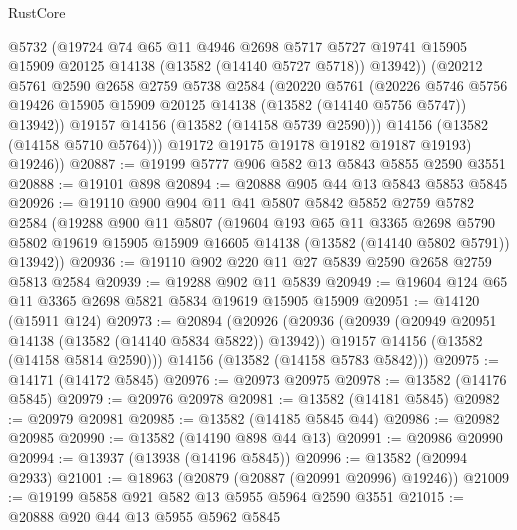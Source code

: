 \begin{lexlean}{RustCore}
\begin{coremodule}
              @5732
              (@19724
                @74
                @65
                @11
                @4946
                @2698
                @5717
                @5727
                @19741
                @15905
                @15909
                @20125
                @14138
                (@13582 (@14140 @5727 @5718))
                @13942))
            (@20212
              @5761
              @2590
              @2658
              @2759
              @5738
              @2584
              (@20220
                @5761
                (@20226
                  @5746
                  @5756
                  @19426
                  @15905
                  @15909
                  @20125
                  @14138
                  (@13582 (@14140 @5756 @5747))
                  @13942))
              @19157
              @14156
              (@13582 (@14158 @5739 @2590)))
            @14156
            (@13582 (@14158 @5710 @5764)))
          @19172
          @19175
          @19178
          @19182
          @19187
          @19193)
        @19246))
@20887 := @19199 @5777 @906 @582 @13 @5843 @5855 @2590 @3551
@20888 := @19101 @898
@20894 := @20888 @905 @44 @13 @5843 @5853 @5845
@20926 := @19110
    @900
    @904
    @11
    @41
    @5807
    @5842
    @5852
    @2759
    @5782
    @2584
    (@19288
      @900
      @11
      @5807
      (@19604
        @193
        @65
        @11
        @3365
        @2698
        @5790
        @5802
        @19619
        @15905
        @15909
        @16605
        @14138
        (@13582 (@14140 @5802 @5791))
        @13942))
@20936 := @19110 @902 @220 @11 @27 @5839 @2590 @2658 @2759 @5813 @2584
@20939 := @19288 @902 @11 @5839
@20949 := @19604 @124 @65 @11 @3365 @2698 @5821 @5834 @19619 @15905 @15909
@20951 := @14120 (@15911 @124)
@20973 := @20894
    (@20926
      (@20936
        (@20939 (@20949 @20951 @14138 (@13582 (@14140 @5834 @5822)) @13942))
        @19157
        @14156
        (@13582 (@14158 @5814 @2590)))
      @14156
      (@13582 (@14158 @5783 @5842)))
@20975 := @14171 (@14172 @5845)
@20976 := @20973 @20975
@20978 := @13582 (@14176 @5845)
@20979 := @20976 @20978
@20981 := @13582 (@14181 @5845)
@20982 := @20979 @20981
@20985 := @13582 (@14185 @5845 @44)
@20986 := @20982 @20985
@20990 := @13582 (@14190 @898 @44 @13)
@20991 := @20986 @20990
@20994 := @13937 (@13938 (@14196 @5845))
@20996 := @13582 (@20994 @2933)
@21001 := @18963 (@20879 (@20887 (@20991 @20996) @19246))
@21009 := @19199 @5858 @921 @582 @13 @5955 @5964 @2590 @3551
@21015 := @20888 @920 @44 @13 @5955 @5962 @5845

\end{coremodule}
\end{lexlean}
